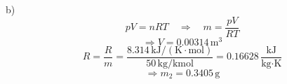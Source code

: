 b) 
\[
pV = nRT \quad \Rightarrow \quad m = \frac{pV}{RT}
\]
\[
\Rightarrow V = 0.00314 \, \text{m}^3
\]
\[
R = \frac{R}{m} = \frac{8.314 \, \text{kJ}/(\text{K} \cdot \text{mol})}{50 \, \text{kg}/\text{kmol}} = 0.16628 \, \frac{\text{kJ}}{\text{kg} \cdot \text{K}}
\]
\[
\Rightarrow m_2 = 0.3405 \, \text{g}
\]